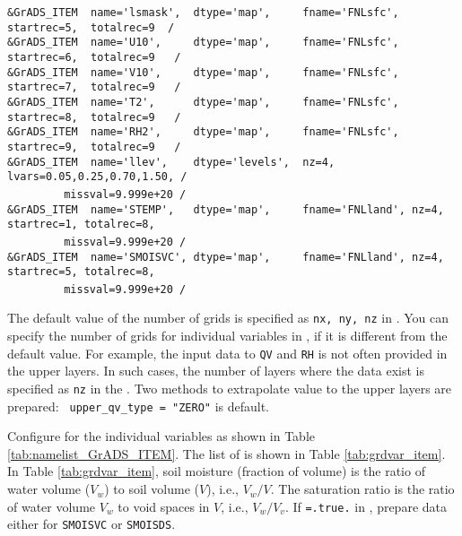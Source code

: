 {\verb|&GrADS_ITEM  name='lsmask',  dtype='map',     fname='FNLsfc', startrec=5,  totalrec=9  /  |  \\
\verb|&GrADS_ITEM  name='U10',     dtype='map',     fname='FNLsfc', startrec=6,  totalrec=9   / |  \\
\verb|&GrADS_ITEM  name='V10',     dtype='map',     fname='FNLsfc', startrec=7,  totalrec=9   / |  \\
\verb|&GrADS_ITEM  name='T2',      dtype='map',     fname='FNLsfc', startrec=8,  totalrec=9   / |  \\
\verb|&GrADS_ITEM  name='RH2',     dtype='map',     fname='FNLsfc', startrec=9,  totalrec=9   / |  \\
\verb|&GrADS_ITEM  name='llev',    dtype='levels',  nz=4, lvars=0.05,0.25,0.70,1.50, /        |  \\
~~~~~~~~\verb| missval=9.999e+20 /|  \\
\verb|&GrADS_ITEM  name='STEMP',   dtype='map',     fname='FNLland', nz=4, startrec=1, totalrec=8,|\\
~~~~~~~~\verb| missval=9.999e+20 /|  \\
\verb|&GrADS_ITEM  name='SMOISVC', dtype='map',     fname='FNLland', nz=4, startrec=5, totalrec=8,|\\
~~~~~~~~\verb| missval=9.999e+20 /|  \\
}

The default value of the number of grids is specified as \verb|nx, ny, nz| in .
You can specify the number of grids for individual variables in , if it is different from the default value.
For example, the input data to \verb|QV| and \verb|RH| is not often provided in the upper layers.
In such cases, the number of layers where the data exist is specified as \verb|nz| in the .
Two methods to extrapolate value to the upper layers are prepared:
\verb| upper_qv_type = "ZERO"| is default.

Configure  for the individual variables as shown in Table \ref{tab:namelist_GrADS_ITEM}.
The list of  is shown in Table \ref{tab:grdvar_item}.
In Table \ref{tab:grdvar_item}, soil moisture (fraction of volume) is the ratio of water volume ($V_w$) to soil volume ($V$), i.e., $V_w / V$.
The saturation ratio is the ratio of water volume $V_w$ to void spaces in $V$, i.e., $V_w / V_v$.
If \verb|=.true.| in , prepare data either for \verb|SMOISVC| or \verb|SMOISDS|.


